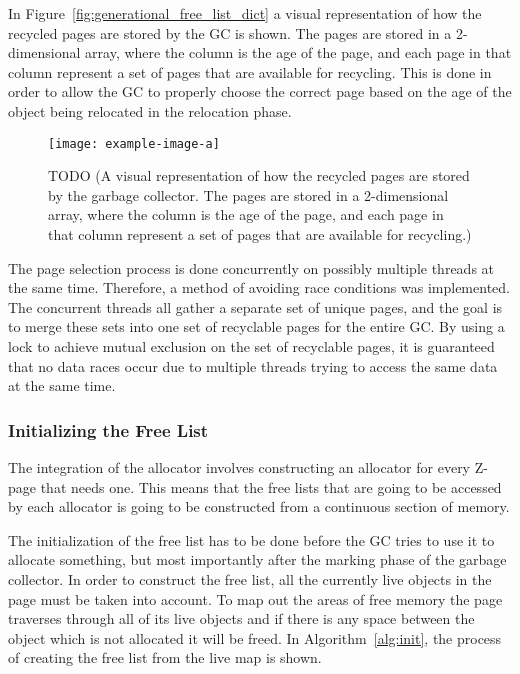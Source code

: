 In Figure~\ref*{fig:generational_free_list_dict} a visual representation of how the recycled pages are stored by the GC is shown. The pages are stored in a 2-dimensional array, where the column is the age of the page, and each page in that column represent a set of pages that are available for recycling. This is done in order to allow the GC to properly choose the correct page based on the age of the object being relocated in the relocation phase.

\begin{figure}
    \centering
    \texttt{[image: example-image-a]}
    \caption{TODO (A visual representation of how the recycled pages are stored by the garbage collector. The pages are stored in a 2-dimensional array, where the column is the age of the page, and each page in that column represent a set of pages that are available for recycling.)}
\end{figure}

The page selection process is done concurrently on possibly multiple threads at the same time. Therefore, a method of avoiding race conditions was implemented. The concurrent threads all gather a separate set of unique pages, and the goal is to merge these sets into one set of recyclable pages for the entire GC. By using a lock to achieve mutual exclusion on the set of recyclable pages, it is guaranteed that no data races occur due to multiple threads trying to access the same data at the same time.

\subsubsection{Initializing the Free List}
The integration of the allocator involves constructing an allocator for every Z-page that needs one. This means that the free lists that are going to be accessed by each allocator is going to be constructed from a continuous section of memory.

The initialization of the free list has to be done before the GC tries to use it to allocate something, but most importantly after the marking phase of the garbage collector. In order to construct the free list, all the currently live objects in the page must be taken into account. To map out the areas of free memory the page traverses through all of its live objects and if there is any space between the object which is not allocated it will be freed. In Algorithm~\ref{alg:init}, the process of creating the free list from the live map is shown.

